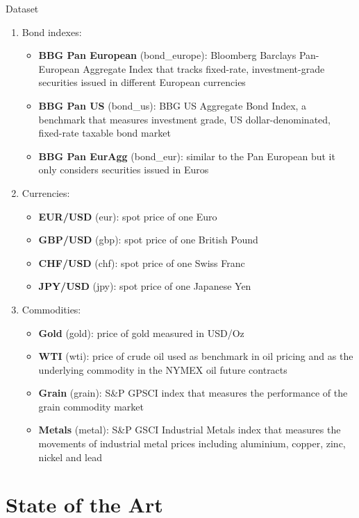 \documentclass[aspectratio=169]{beamer}
\newcommand\Fontvi{\fontsize{8}{7.2}\selectfont}
\begin{document}
\begin{frame}[allowframebreaks]{Dataset}
\begin{enumerate}
	\item Bond indexes:
	\begin{itemize}
		\Fontvi
		\item \textbf{BBG Pan European} (bond\_europe): Bloomberg Barclays Pan-European Aggregate Index that tracks fixed-rate, investment-grade securities issued in different European currencies
		\item \textbf{BBG Pan US} (bond\_us): BBG US Aggregate Bond Index, a benchmark that measures investment grade, US dollar-denominated, fixed-rate taxable bond market
		\item \textbf{BBG Pan EurAgg} (bond\_eur): similar to the Pan European but it only considers securities issued in Euros
	\end{itemize} 
	\item Currencies:
	\begin{itemize}
		\Fontvi
		\item \textbf{EUR/USD} (eur): spot price of one Euro
		\item \textbf{GBP/USD} (gbp): spot price of one British Pound
		\item \textbf{CHF/USD} (chf): spot price of one Swiss Franc
		\item \textbf{JPY/USD} (jpy): spot price of one Japanese Yen
	\end{itemize}
	\item Commodities:
	\begin{itemize}
		\Fontvi
		\item \textbf{Gold} (gold): price of gold measured in USD/Oz
		\item \textbf{WTI} (wti): price of crude oil used as benchmark in oil pricing and as the underlying commodity in the NYMEX oil future contracts
		\item \textbf{Grain} (grain): S\&P GPSCI index that measures the performance of the grain commodity market
		\item \textbf{Metals} (metal): S\&P GSCI Industrial Metals index that measures the movements of industrial metal prices including aluminium, copper, zinc, nickel and lead
	\end{itemize}
\end{enumerate}
\end{frame}

\section{State of the Art}
\end{document}

